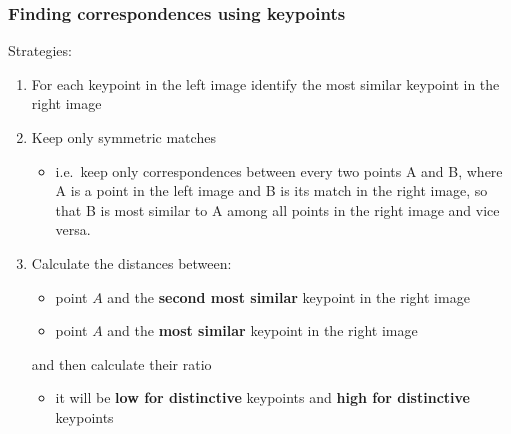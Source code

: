 \documentclass{article}
\begin{document}
    \subsubsection{Finding correspondences using keypoints}
    Strategies:
    \begin{enumerate}
        \item For each keypoint in the left image identify the most similar keypoint in the right image
        \item Keep only symmetric matches
        \begin{itemize}
            \item i.e.\ keep only correspondences between every two points A and B, where A is a point in the left image and B is its match in the right image, so that B is most similar to A among all points in the right image and vice versa.
        \end{itemize}
        \item Calculate the distances between:
        \begin{itemize}
            \item point $A$ and the \textbf{second most similar} keypoint in the right image
            \item point $A$ and the \textbf{most similar} keypoint in the right image 
        \end{itemize}
        and then calculate their ratio
        \begin{itemize}
            \item it will be \textbf{low for distinctive} keypoints and \textbf{high for distinctive} keypoints
        \end{itemize}
    \end{enumerate}

    \newpage
\end{document}
